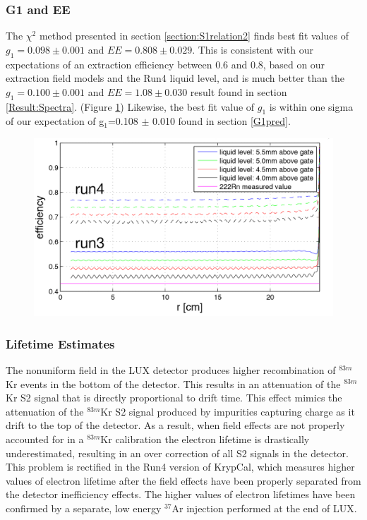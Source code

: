 \subsubsection{G1 and EE}

The $\chi^2$ method presented in section \ref{section:S1relation2} finds best fit values of $g_1=0.098 \pm 0.001$ and $EE=0.808 \pm 0.029$.  This is consistent with our expectations of an extraction efficiency between 0.6 and 0.8, based on our extraction field models and the Run4 liquid level, and is much better than the $g_1=0.100 \pm 0.001$ and $EE=1.08 \pm 0.030$ result found in section \ref{Result:Spectra}. (Figure \ref{EEexpec})  Likewise, the best fit value of $g_1$ is within one sigma of our expectation of g$_1$=0.108 $\pm$ 0.010 found in section \ref{G1pred}. 

\begin{figure}[!h]
\includegraphics[scale=0.5]{Run04Corrections/GuschinEE.png}
 \label{EEexpec}
\end{figure}


\subsubsection{Lifetime Estimates}

The nonuniform field in the LUX detector produces higher recombination of $^{83m}$Kr events in the bottom of the detector.  This results in an attenuation of the $^{83m}$Kr S2 signal that is directly proportional to drift time.  This effect mimics the attenuation of the $^{83m}$Kr S2 signal produced by impurities capturing charge as it drift to the top of the detector.  As a result, when field effects are not properly accounted for in a $^{83m}$Kr calibration the electron lifetime is drastically underestimated, resulting in an over correction of all S2 signals in the detector.  This problem is rectified in the Run4 version of KrypCal, which measures higher values of electron lifetime after the field effects have been properly separated from the detector inefficiency effects.  The higher values of electron lifetimes have been confirmed by a separate, low energy $^{37}$Ar injection performed at the end of LUX.


